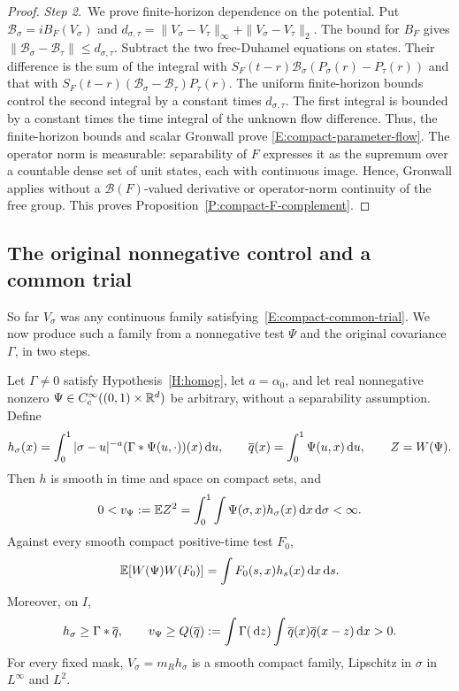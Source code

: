 \begin{proof}
  \medskip
  \noindent\textit{Step 2.~}We prove finite-horizon dependence on the
  potential.
  Put $\mathcal{B}_\sigma = iB_F(V_\sigma)$ and $d_{\sigma,\tau} =
  \|V_\sigma-V_\tau\|_\infty+ \|V_\sigma-V_\tau\|_2$. The bound for $B_F$ gives
  $\|\mathcal{B}_\sigma-\mathcal{B}_\tau\| \le d_{\sigma,\tau}$. Subtract the
  two free-Duhamel equations on states. Their difference is the sum of the
  integral with $S_F(t-r)\mathcal{B}_\sigma(P_\sigma(r)-P_\tau(r))$ and that
  with $S_F(t-r)(\mathcal{B}_\sigma-\mathcal{B}_\tau)P_\tau(r)$. The uniform
  finite-horizon bounds control the second integral by a constant times
  $d_{\sigma,\tau}$. The first integral is bounded by a constant times the
  time integral of the unknown flow difference. Thus, the
  finite-horizon bounds and scalar Gronwall prove
  \eqref{E:compact-parameter-flow}. The operator norm is measurable:
  separability of $F$ expresses it as the supremum over a countable dense set of
  unit states, each with continuous image. Hence, Gronwall applies without a
  $\mathcal{B}(F)$-valued derivative or operator-norm continuity of the free
  group. This proves Proposition~\ref{P:compact-F-complement}.
\end{proof}

\subsection{The original nonnegative control and a common trial}

So far $V_\sigma$ was any continuous family
satisfying~\eqref{E:compact-common-trial}. We now produce such a family from a
nonnegative test $\Psi$ and the original covariance $\Gamma$, in two steps.

\begin{lemma}\label{L:compact-raw-profile}
  Let $\Gamma \ne 0$ satisfy Hypothesis~\ref{H:homog}, let $a = \alpha_0$, and
  let real nonnegative nonzero $\Psi \in C_c^\infty((0,1)\times\mathbb{R}^d)$ be
  arbitrary, without a separability assumption. Define
  \begin{equation}\label{E:compact-raw-mean}
    h_\sigma(x)=\int_0^1|\sigma-u|^{-a}
    (\Gamma*\Psi(u,\cdot))(x)\,\mathrm{d} u,\qquad
    \overline{q}(x)=\int_0^1\Psi(u,x)\,\mathrm{d} u,\qquad Z=W(\Psi).
  \end{equation}
  Then $h$ is smooth in time and space on compact sets, and
  \begin{equation}\label{E:compact-raw-cost}
    0<v_\Psi:=\mathbb{E} Z^2
    =\int_0^1\int\Psi(\sigma,x)h_\sigma(x)\,\mathrm{d} x\,\mathrm{d}\sigma<\infty.
  \end{equation}
  Against every smooth compact positive-time test $F_0$,
  \[
    \mathbb{E}[W(\Psi)W(F_0)]=\int F_0(s,x)h_s(x)\,\mathrm{d} x\,\mathrm{d} s.
  \]
  Moreover, on $I$,
  \begin{equation}\label{E:compact-positive-mean-floor}
    h_\sigma\ge\Gamma*\overline{q},\qquad
    v_\Psi\ge Q(\overline{q})
    :=\int\Gamma(\,\mathrm{d} z)\int\overline{q}(x)\overline{q}(x-z)\,\mathrm{d} x>0.
  \end{equation}
  For every fixed mask, $V_\sigma = m_Rh_\sigma$ is a smooth compact family,
  Lipschitz in $\sigma$ in $L^\infty$ and $L^2$.
\end{lemma}

